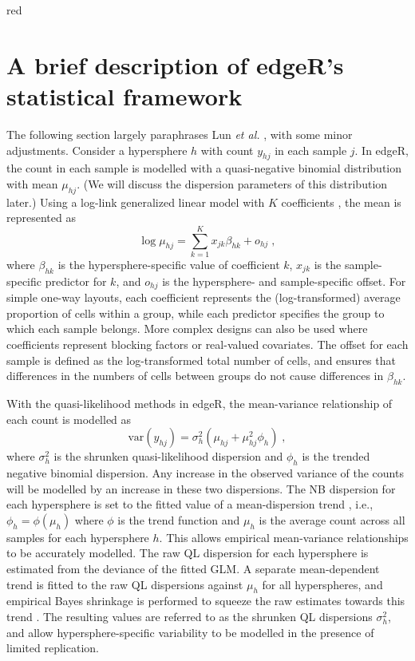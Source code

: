 \documentclass{article}
\begin{document}
\begin{color}{red}
\section{A brief description of edgeR's statistical framework}
The following section largely paraphrases Lun \textit{et al.} \cite{lun2016delicious}, with some minor adjustments.
Consider a hypersphere $h$ with count $y_{hj}$ in each sample $j$.
In edgeR, the count in each sample is modelled with a quasi-negative binomial distribution with mean $\mu_{hj}$.
(We will discuss the dispersion parameters of this distribution later.)
Using a log-link generalized linear model with $K$ coefficients \cite{mccarthy2012differential}, the mean is represented as
\[
    \log \mu_{hj} = \sum_{k=1}^K x_{jk} \beta_{hk} + o_{hj} \;,
\]
where $\beta_{hk}$ is the hypersphere-specific value of coefficient $k$, $x_{jk}$ is the sample-specific predictor for $k$, and $o_{hj}$ is the hypersphere- and sample-specific offset.
For simple one-way layouts, each coefficient represents the (log-transformed) average proportion of cells within a group, while each predictor specifies the group to which each sample belongs.
More complex designs can also be used where coefficients represent blocking factors or real-valued covariates.
The offset for each sample is defined as the log-transformed total number of cells, and ensures that differences in the numbers of cells between groups do not cause differences in $\beta_{hk}$.

With the quasi-likelihood methods in edgeR, the mean-variance relationship of each count is modelled as
\[
    \mbox{var}(y_{hj}) = \sigma^2_{h} (\mu_{hj} + \mu_{hj}^2 \phi_h) \;,
\]
where $\sigma^2_h$ is the shrunken quasi-likelihood dispersion and $\phi_h$ is the trended negative binomial dispersion.
Any increase in the observed variance of the counts will be modelled by an increase in these two dispersions.
The NB dispersion for each hypersphere is set to the fitted value of a mean-dispersion trend \cite{mccarthy2012differential}, i.e., $\phi_h = \phi(\mu_h)$ where $\phi$ is the trend function and $\mu_h$ is the average count across all samples for each hypersphere $h$.
This allows empirical mean-variance relationships to be accurately modelled.
The raw QL dispersion for each hypersphere is estimated from the deviance of the fitted GLM.
A separate mean-dependent trend is fitted to the raw QL dispersions against $\mu_h$ for all hyperspheres, and empirical Bayes shrinkage is performed to squeeze the raw estimates towards this trend \cite{lund2012detecting}.
The resulting values are referred to as the shrunken QL dispersions $\sigma^2_h$, and allow hypersphere-specific variability to be modelled in the presence of limited replication.


\end{color}
\end{document}
